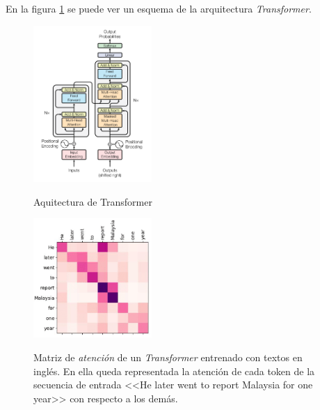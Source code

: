 En la figura \ref{fig:transformer_architecture} se puede ver un esquema de la arquitectura \textit{Transformer}.

\begin{figure}[H]
    \caption[Aquitectura de Transformer]{Aquitectura de Transformer}
    \centering
    \includegraphics[width=0.4\textwidth]{./figuras/Transformer_architecture.png}
    \label{fig:transformer_architecture}
\end{figure}

\begin{figure}[H]
    \caption[Matriz de \textit{atención} de un \textit{Transformer} entrenado con textos en inglés]{Matriz de \textit{atención} de un \textit{Transformer} entrenado con textos en inglés. En ella queda representada la atención de cada token de la secuencia de entrada <<He later went to report Malaysia for one year>> con respecto a los demás.}
    \centering
    \includegraphics[width=0.4\textwidth]{./figuras/Transformer_attention_matrix.png}
    \label{fig:transformer_attention}
\end{figure}
